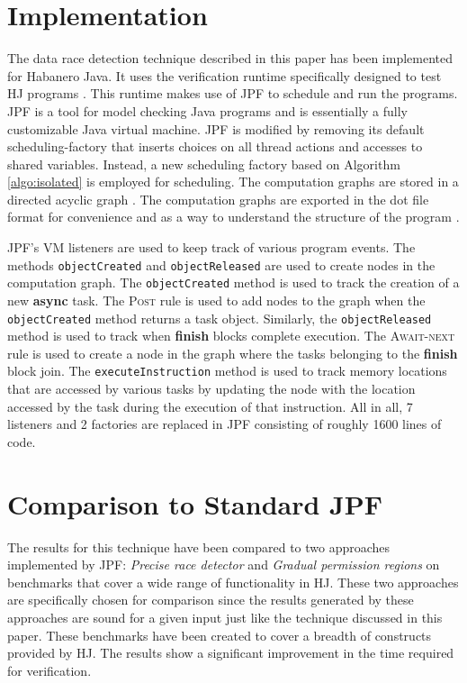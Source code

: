 \section{Implementation}
The data race detection technique described in this paper has been implemented for Habanero Java. It uses the verification runtime specifically designed to test HJ programs \cite{anderson2014jpf}. This runtime makes use of JPF to schedule and run the programs. JPF is a tool for model checking Java programs and is essentially a fully customizable Java virtual machine. JPF is modified by  removing its default scheduling-factory that inserts choices on all thread actions and accesses to shared variables. Instead, a new scheduling factory based on Algorithm \ref{algo:isolated} is employed for scheduling. The computation graphs are stored in a directed acyclic graph \cite{jgrapht}. The computation graphs are exported in the dot file format for convenience and as a way to understand the structure of the program \cite{graphviz}.

JPF's VM listeners are used to keep track of various program events. The methods \texttt{objectCreated} and \texttt{objectReleased} are used to create nodes in the computation graph. The \texttt{objectCreated} method is used to track the creation of a new \textbf{async} task. The \textsc{Post} rule is used to add nodes to the graph when the \texttt{objectCreated} method returns a task object. Similarly, the \texttt{objectReleased} method is used to track when \textbf{finish} blocks complete execution. The \textsc{Await-next} rule is used to create a node in the graph where the tasks belonging to the \textbf{finish} block join. The \texttt{executeInstruction} method is used to track memory locations that are accessed by various tasks by updating the node with the location accessed by the task during the execution of that instruction. All in all, 7 listeners and 2 factories are replaced in JPF consisting of roughly 1600 lines of code. 

\section{Comparison to Standard JPF}
The results for this technique have been compared to two approaches implemented by JPF: \textit{Precise race detector} and \textit{Gradual permission regions} on benchmarks that cover a wide range of functionality in HJ. These two approaches are specifically chosen for comparison since the results generated by these approaches are sound for a given input just like the technique discussed in this paper. These benchmarks have been created to cover a breadth of constructs provided by HJ. The results show a significant improvement in the time required for verification. 

